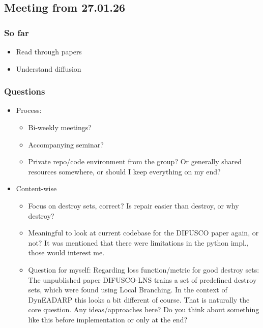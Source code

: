 \subsection{Meeting from 27.01.26}
\subsubsection{So far}
\begin{itemize}
    \item Read through papers
    \item Understand diffusion
\end{itemize}
\subsubsection{Questions}
\begin{itemize}
    \item Process:
    \begin{itemize}
        \item Bi-weekly meetings? 
        \item Accompanying seminar? 
        \item Private repo/code environment from the group? Or generally shared resources somewhere, or should I keep everything on my end? 
    \end{itemize}
    \item Content-wise
    \begin{itemize}
        \item Focus on destroy sets, correct? Is repair easier than destroy, or why destroy? 
        \item Meaningful to look at current codebase for the DIFUSCO paper again, or not? It was mentioned that there were limitations in the python impl., those would interest me. 
        \item Question for myself: Regarding loss function/metric for good destroy sets: The unpublished paper DIFUSCO-LNS trains a set of predefined destroy sets, which were found using Local Branching. In the context of DynEADARP this looks a bit different of course. That is naturally the core question. Any ideas/approaches here? Do you think about something like this before implementation or only at the end?
    \end{itemize}
\end{itemize}
